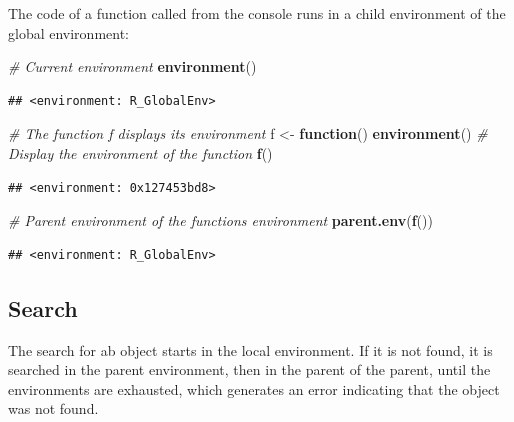 \documentclass[
  12pt,
  american,
  a4paper,
  extrafontsizes,onecolumn,openright
  ]{memoir}
\newenvironment{Shaded}{\begin{snugshade}}{\end{snugshade}}
\newcommand{\CommentTok}[1]{\textcolor[rgb]{0.56,0.35,0.01}{\textit{#1}}}
\newcommand{\ControlFlowTok}[1]{\textcolor[rgb]{0.13,0.29,0.53}{\textbf{#1}}}
\newcommand{\FunctionTok}[1]{\textcolor[rgb]{0.13,0.29,0.53}{\textbf{#1}}}
\newcommand{\NormalTok}[1]{#1}
\newcommand{\OtherTok}[1]{\textcolor[rgb]{0.56,0.35,0.01}{#1}}
\begin{document}
\normalsize

The code of a function called from the console runs in a child environment of the global environment:

\scriptsize

\begin{Shaded}
\begin{Highlighting}[]
\CommentTok{\# Current environment}
\FunctionTok{environment}\NormalTok{()}
\end{Highlighting}
\end{Shaded}

\begin{verbatim}
## <environment: R_GlobalEnv>
\end{verbatim}

\begin{Shaded}
\begin{Highlighting}[]
\CommentTok{\# The function f displays its environment}
\NormalTok{f }\OtherTok{\textless{}{-}} \ControlFlowTok{function}\NormalTok{() }\FunctionTok{environment}\NormalTok{()}
\CommentTok{\# Display the environment of the function}
\FunctionTok{f}\NormalTok{()}
\end{Highlighting}
\end{Shaded}

\begin{verbatim}
## <environment: 0x127453bd8>
\end{verbatim}

\begin{Shaded}
\begin{Highlighting}[]
\CommentTok{\# Parent environment of the function\textquotesingle{}s environment}
\FunctionTok{parent.env}\NormalTok{(}\FunctionTok{f}\NormalTok{())}
\end{Highlighting}
\end{Shaded}

\begin{verbatim}
## <environment: R_GlobalEnv>
\end{verbatim}

\normalsize

\subsection{Search}\label{search}

The search for ab object starts in the local environment.
If it is not found, it is searched in the parent environment, then in the parent of the parent, until the environments are exhausted, which generates an error indicating that the object was not found.
\end{document}
